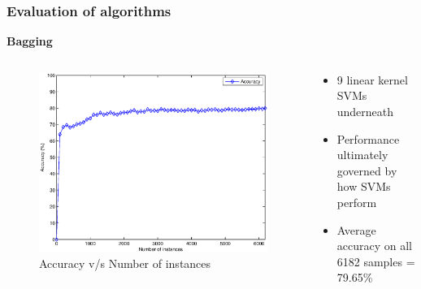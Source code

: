 \documentclass{beamer}
\begin{document}
    \begin{frame}
        \frametitle{Evaluation of algorithms}
        \begin{center}
            \textbf{Bagging}
        \end{center}
        \begin{columns}
            \begin{column}{0.5\textwidth}
                \begin{figure}
                    \centering
                    \includegraphics[width=\textwidth]{figures/bagging_accuracy.eps}
                    \caption{Accuracy v/s Number of instances}
                \end{figure}
            \end{column}
            \begin{column}{0.5\textwidth}
                \begin{itemize}
                    \item{9 linear kernel SVMs underneath}
                    \item{Performance ultimately governed by how SVMs perform}
                    \item{Average accuracy on all 6182 samples = 79.65\%}
                \end{itemize}
            \end{column}
        \end{columns}
    \end{frame}
    
\end{document}
